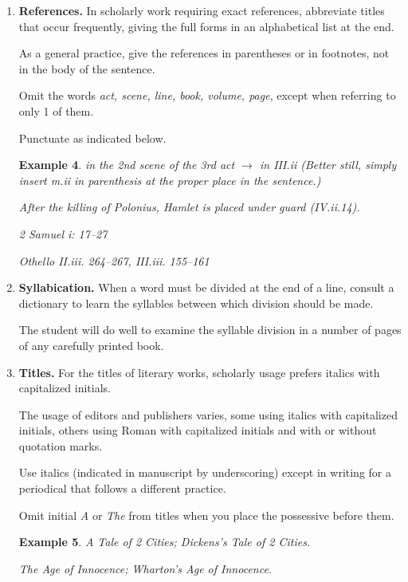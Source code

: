 \documentclass{article}
\newtheorem{example}{Example}
\begin{document}
\begin{enumerate}
\begin{example}
		Bliss was it in that dawn to be alive,
		
		But to be young was very heaven!
	\end{example}
	Quotations introduced by {\it that} are indirect discourse and not enclosed in quotation marks.
	\begin{example}
		Keats declares that beauty is truth, truth beauty.
		
		Dickinson states that a coffin is a small domain.
	\end{example}
	Proverbial expressions and familiar phrases of literary origin require no quotation marks.
	\begin{example}
		These are the times that try men's souls.
		
		He lives far from the madding crowd.
	\end{example}
	\item {\bf References.} In scholarly work requiring exact references, abbreviate titles that occur frequently, giving the full forms in an alphabetical list at the end.
	
	As a general practice, give the references in parentheses or in footnotes, not in the body of the sentence.
	
	Omit the words {\it act, scene, line, book, volume, page}, except when referring to only 1 of them.
	
	Punctuate as indicated below.
	\begin{example}
		in the 2nd scene of the 3rd act $\to$ in III.ii (Better still, simply insert m.ii in parenthesis at the proper place in the sentence.)
		
		After the killing of Polonius, Hamlet is placed under guard (IV.ii.14).
		
		2 Samuel i: 17--27
		
		Othello II.iii. 264--267, III.iii. 155--161
	\end{example}
	\item {\bf Syllabication.} When a word must be divided at the end of a line, consult a dictionary to learn the syllables between which division should be made.
	
	The student will do well to examine the syllable division in a number of pages of any carefully printed book.
	\item {\bf Titles.} For the titles of literary works, scholarly usage prefers italics with capitalized initials.
	
	The usage of editors and publishers varies, some using italics with capitalized initials, others using Roman with capitalized initials and with or without quotation marks.
	
	Use italics (indicated in manuscript by underscoring) except in writing for a periodical that follows a different practice.
	
	Omit initial {\it A} or {\it The} from titles when you place the possessive before them.
	\begin{example}
		\emph{A} Tale of 2 Cities; \emph{Dickens's} Tale of 2 Cities.
		
		The Age of Innocence; \emph{Wharton's} Age of Innocence.
	\end{example}
\end{enumerate}
\end{document}
